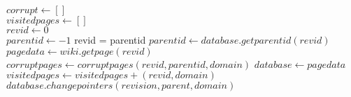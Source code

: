 \begin{algorithmic}
  $corrupt \gets []$\\
  $visitedpages \gets []$\\
  $revid \gets 0$\\
  $parentid \gets -1$
      revid = parentid
          \State $parentid \gets database.getparentid(revid)$
      \Else
          \State $pagedata \gets wiki.getpage(revid)$
      \EndIf
          \State $corruptpages \gets corruptpages (revid, parentid, domain)$
      \Else
          \State $database \gets page data$
      \EndIf
          \State $visitedpages \gets visitedpages + (revid, domain)$
  \EndWhile
      \State $database.changepointers(revision, parent, domain)$\\
  \EndFor
\end{algorithmic}
